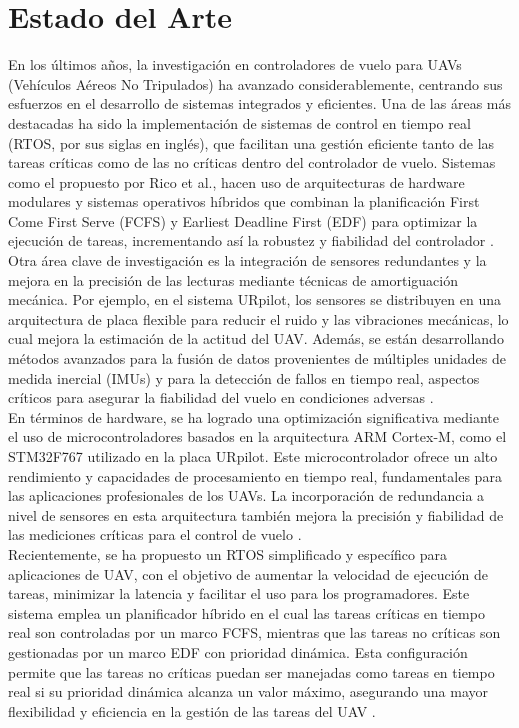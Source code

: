 
\section{Estado del Arte}

En los últimos años, la investigación en controladores de vuelo para UAVs (Vehículos Aéreos No Tripulados) ha avanzado considerablemente, centrando sus esfuerzos en el desarrollo de sistemas integrados y eficientes. Una de las áreas más destacadas ha sido la implementación de sistemas de control en tiempo real (RTOS, por sus siglas en inglés), que facilitan una gestión eficiente tanto de las tareas críticas como de las no críticas dentro del controlador de vuelo. Sistemas como el propuesto por Rico et al., hacen uso de arquitecturas de hardware modulares y sistemas operativos híbridos que combinan la planificación First Come First Serve (FCFS) y Earliest Deadline First (EDF) para optimizar la ejecución de tareas, incrementando así la robustez y fiabilidad del controlador \cite{paper} \cite{rtos}.\\

Otra área clave de investigación es la integración de sensores redundantes y la mejora en la precisión de las lecturas mediante técnicas de amortiguación mecánica. Por ejemplo, en el sistema URpilot, los sensores se distribuyen en una arquitectura de placa flexible para reducir el ruido y las vibraciones mecánicas, lo cual mejora la estimación de la actitud del UAV. Además, se están desarrollando métodos avanzados para la fusión de datos provenientes de múltiples unidades de medida inercial (IMUs) y para la detección de fallos en tiempo real, aspectos críticos para asegurar la fiabilidad del vuelo en condiciones adversas \cite{rtos}.\\

En términos de hardware, se ha logrado una optimización significativa mediante el uso de microcontroladores basados en la arquitectura ARM Cortex-M, como el STM32F767 utilizado en la placa URpilot. Este microcontrolador ofrece un alto rendimiento y capacidades de procesamiento en tiempo real, fundamentales para las aplicaciones profesionales de los UAVs. La incorporación de redundancia a nivel de sensores en esta arquitectura también mejora la precisión y fiabilidad de las mediciones críticas para el control de vuelo \cite{rtos}.\\

Recientemente, se ha propuesto un RTOS simplificado y específico para aplicaciones de UAV, con el objetivo de aumentar la velocidad de ejecución de tareas, minimizar la latencia y facilitar el uso para los programadores. Este sistema emplea un planificador híbrido en el cual las tareas críticas en tiempo real son controladas por un marco FCFS, mientras que las tareas no críticas son gestionadas por un marco EDF con prioridad dinámica. Esta configuración permite que las tareas no críticas puedan ser manejadas como tareas en tiempo real si su prioridad dinámica alcanza un valor máximo, asegurando una mayor flexibilidad y eficiencia en la gestión de las tareas del UAV \cite{rtos}.\\